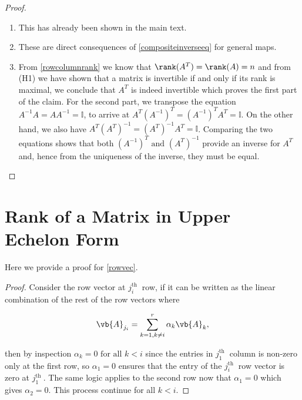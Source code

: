 \documentclass[a4paper,12pt]{report}
\begin{document}
\begin{appendices}
\begin{proof}
    \begin{enumerate}[label=(\(H\)\arabic*)]
        \item This has already been shown in the main text.
        \item These are direct consequences of \cref{compositeinverseeq} for general maps.
        \item From \cref{rowcolumnrank} we know that \(\rank (A^{T} ) = \rank (A) = n\) and from (H1) we have shown that a matrix is invertible if and only if its rank is maximal, we conclude that \(A^{T} \) is indeed invertible which proves the first part of the claim. For the second part, we transpose the equation \(A^{-1} A = AA^{-1} = \mathbb{I}\), to arrive at \(A^{T} (A^{-1} )^{T} = (A^{-1} )^{T}A^{T} = \mathbb{I}    \). On the other hand, we also have \(A^{T}(A^{T} )^{-1} = (A^{T} )^{-1} A^{T} =\mathbb{I} \). Comparing the two equations shows that both \((A^{-1} )^{T} \text { and } (A^{T} )^{-1}  \) provide an inverse for \(A^{T} \) and, hence from the uniqueness of the inverse, they must be equal.       
    \end{enumerate}
\end{proof}
    
\section{Rank of a Matrix in Upper Echelon Form} \label{rowvecapp} 

Here we provide a proof for \cref{rowvec}.

\begin{proof}
    Consider the row vector at \(j_{i} ^{\text{th }} \) row, if it can be written as the linear combination of the rest of the row vectors where
    
    \begin{equation}
        \vb{A} _{j_{i} } = \sum_{k=1, k \neq i}^{r} \alpha _{k} \vb{A} _{k},  
    \end{equation}
    
    then by inspection \(\alpha _{k} = 0 \text{ for all } k<i \) since the entries in \(j_{1}^{\text{th }}  \) column is non-zero only at the first row, so \(\alpha _{1} = 0\) ensures that the entry of the \(j_{i}^ {\text{th }}  \) row vector is zero at \(j_{1}^{\text{th }}  \). The same logic applies to the second row now that \(\alpha _{1} = 0 \) which gives \(\alpha _{2} =0\). This process continue for all \(k < i\). 
    

\end{proof}
\end{appendices}
\end{document}
